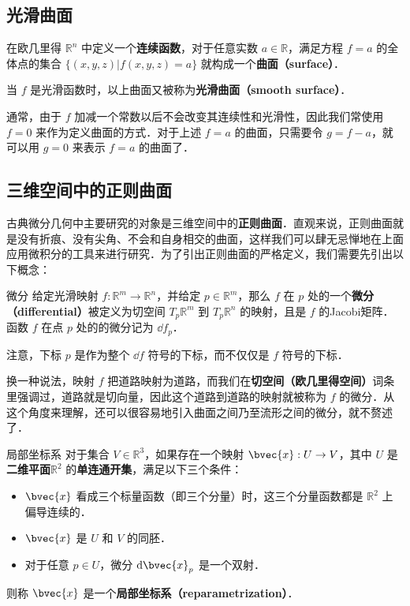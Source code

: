 
\subsection{光滑曲面}

在欧几里得 $\mathbb{R}^n$ 中定义一个\textbf{连续函数}，对于任意实数 $a\in\mathbb{R}$，满足方程 $f=a$ 的全体点的集合 $\{(x, y, z)|f(x, y, z)=a\}$ 就构成一个\textbf{曲面（surface）}．

当 $f$ 是光滑函数时，以上曲面又被称为\textbf{光滑曲面（smooth surface）}．

通常，由于 $f$ 加减一个常数以后不会改变其连续性和光滑性，因此我们常使用 $f=0$ 来作为定义曲面的方式．对于上述 $f=a$ 的曲面，只需要令 $g=f-a$，就可以用 $g=0$ 来表示 $f=a$ 的曲面了．

\subsection{三维空间中的正则曲面}

古典微分几何中主要研究的对象是三维空间中的\textbf{正则曲面}．直观来说，正则曲面就是没有折痕、没有尖角、不会和自身相交的曲面，这样我们可以肆无忌惮地在上面应用微积分的工具来进行研究．为了引出正则曲面的严格定义，我们需要先引出以下概念：

\begin{definition}{微分}
给定光滑映射 $f:\mathbb{R}^m\to\mathbb{R}^n$，并给定 $p\in\mathbb{R}^m$，那么 $f$ 在 $p$ 处的一个\textbf{微分（differential）}被定义为切空间 $T_p\mathbb{R}^m$ 到 $T_p\mathbb{R}^n$ 的映射，且是 $f$ 的Jacobi矩阵．函数 $f$ 在点 $p$ 处的的微分记为 $\dd f_p$．
\end{definition}

注意，下标 $p$ 是作为整个 $\dd f$ 符号的下标，而不仅仅是 $f$ 符号的下标．

换一种说法，映射 $f$ 把道路映射为道路，而我们在\textbf{切空间（欧几里得空间）}词条里强调过，道路就是切向量，因此这个道路到道路的映射就被称为 $f$ 的微分．从这个角度来理解，还可以很容易地引入曲面之间乃至流形之间的微分，就不赘述了．


\begin{definition}{局部坐标系}
对于集合 $V\in \mathbb{R}^3$，如果存在一个映射 $\bvec{x}:U\to V$，其中 $U$ 是\textbf{二维平面}$\mathbb{R}^2$ 的\textbf{单连通开集}，满足以下三个条件：
\begin{itemize}
\item $\bvec{x}$ 看成三个标量函数（即三个分量）时，这三个分量函数都是 $\mathbb{R}^2$ 上偏导连续的．
\item $\bvec{x}$ 是 $U$ 和 $V$ 的同胚．
\item 对于任意 $p\in U$，微分 $\mathrm{d}\bvec{x}_p$ 是一个双射．
\end{itemize}
则称 $\bvec{x}$ 是一个\textbf{局部坐标系（reparametrization）}．
\end{definition}

